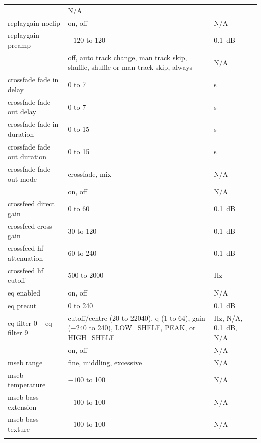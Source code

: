 \begin{center}
\begin{longtable}{>{\raggedright}p{}>{\raggedright}p{}p{}}
                                        & N/A\\
      replaygain noclip
                    & on, off           & N/A\\
      replaygain preamp
                    & $-120$ to 120     & 0.1~dB\\
%
      \opt{crossfade}{
      crossfade     & off, auto track change, man track skip, shuffle,
                    shuffle or man track skip, always
                                        & N/A\\
      crossfade fade in delay
                    & 0 to 7            & s\\
      crossfade fade out delay
                    & 0 to 7            & s\\
      crossfade fade in duration
                    & 0 to 15           & s\\
      crossfade fade out duration
                    & 0 to 15           & s\\
      crossfade fade out mode
                    & crossfade, mix    & N/A\\
      }
%
      crossfeed     & on, off           & N/A\\
      crossfeed direct gain
                    & 0 to 60           & 0.1~dB\\
      crossfeed cross gain
                    & 30 to 120         & 0.1~dB\\
      crossfeed hf attenuation
                    & 60 to 240         & 0.1~dB\\
      crossfeed hf cutoff
                    & 500 to 2000       & Hz\\
%
      eq enabled    & on, off           & N/A\\
      eq precut     & 0 to 240          & 0.1~dB\\
      eq filter 0 -- eq filter 9
                    & cutoff/centre (20 to 22040), q (1 to 64),
                      gain ($-240$ to 240), LOW\_SHELF, PEAK, or HIGH\_SHELF
                    & Hz, N/A, 0.1~dB, N/A\\
%
      \opt{mseb}{
      mseb enabled  & on, off           & N/A\\
      mseb range    & fine, middling, excessive & N/A\\
      mseb temperature & $-100$ to 100  & N/A\\
      mseb bass extension & $-100$ to 100 & N/A\\
      mseb bass texture & $-100$ to 100 & N/A\\
}
\end{longtable}
\end{center}
